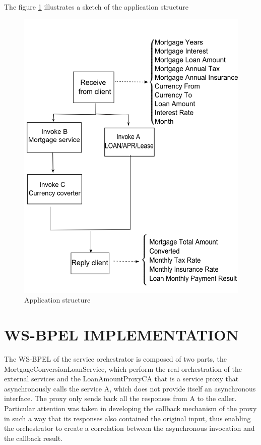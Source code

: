 \documentclass[
10pt, %
a4paper, %
oneside, %
headinclude,footinclude, %
BCOR5mm, %
]{scrartcl}
\begin{document}
The figure \ref{fig:Scheme} illustrates a sketch of the application structure
\begin{figure}[tb]
\centering 
\includegraphics[width=1\columnwidth]{./pictures/APIScheme.png} 
\caption[Application Structure]{Application structure}  %
\label{fig:Scheme} 
\end{figure}


\section{WS-BPEL IMPLEMENTATION}

The WS-BPEL of the service orchestrator is composed of two parts, the
MortgageConversionLoanService, which perform the real orchestration of the external
services and the LoanAmountProxyCA that is a service proxy that
asynchronously calls the service A, which does not provide itself an asynchronous
interface. The proxy only sends back all the responses from A to
the caller. Particular attention was taken in developing the callback mechanism
of the proxy in such a way that its responses also contained the original
input, thus enabling the orchestrator to create a correlation between the
asynchronous invocation and the callback result.
\end{document}

